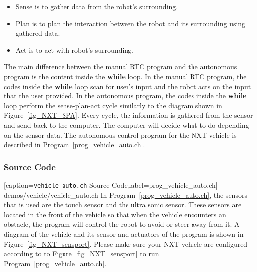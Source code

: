 \documentclass[11pt]{article}
\begin{document}
\begin{itemize}
\item Sense is to gather data from the robot's surrounding.
\item Plan is to plan the interaction between the robot and its surrounding using 
    gathered data.
\item Act is to act with robot's surrounding.
\end{itemize}
The main difference between the manual RTC program and the autonomous program is 
the content inside the {\bf while} loop. In the manual RTC program, the codes inside 
the {\bf while} loop scan for user's input and the robot acts on the input that the 
user provided. In the autonomous program, the codes inside the {\bf while} loop 
perform the sense-plan-act cycle similarly to the diagram shown in Figure~\ref{fig_NXT_SPA}. 
Every cycle, the information is gathered from the sensor and send back to the computer. 
The computer will decide what to do depending on the sensor data. The autonomous 
control program for the NXT vehicle is described in Program~\ref{prog_vehicle_auto.ch}.

\subsubsection*{Source Code}

[caption={{\tt vehicle\_auto.ch} Source Code},label=prog_vehicle_auto.ch]
{demos/vehicle/vehicle_auto.ch}
In Program~\ref{prog_vehicle_auto.ch}, the sensors that is used are the touch 
sensor and the ultra sonic sensor. These sensors are located in the front of 
the vehicle so that when the vehicle encounters an obstacle, the program will
control the robot to avoid or steer away from it. A diagram of the vehicle and 
its sensor and actuators of the program is shown in Figure~\ref{fig_NXT_sensport}. 
Please make sure your NXT vehicle are configured according to to Figure~\ref{fig_NXT_sensport} 
to run Program~\ref{prog_vehicle_auto.ch}.
\end{document}
